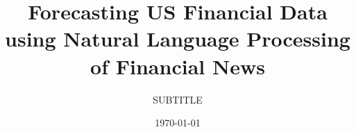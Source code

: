 \documentclass[nofilelist]{cslthse-msc}
\title{Forecasting US Financial Data using Natural Language Processing of Financial News}
\subtitle{SUBTITLE}
\date{\today}
\begin{document}
\renewcommand{\bibname}{References}

\makefrontmatter






{} %

\begin{appendices}




\printfilelist

\checkoddpage
\ifoddpage
\else
   \newpage
   \thispagestyle{empty}
   \mbox{ }
\fi

\end{appendices}
\end{document}

